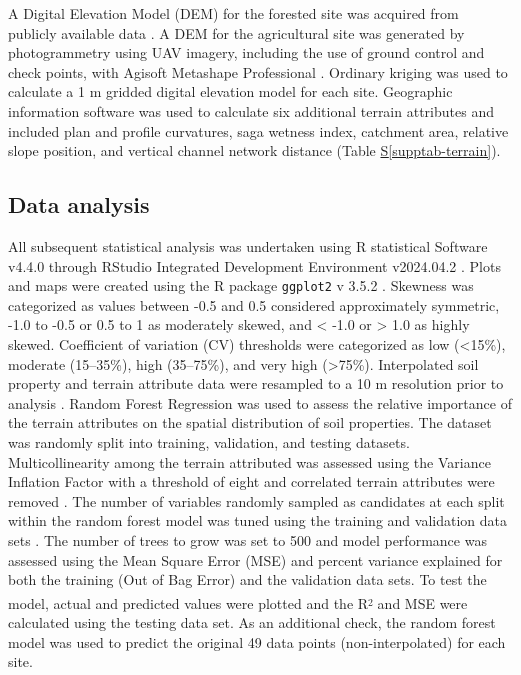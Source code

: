 \documentclass[
  number]{elsarticle}
\newcommand*\quartosupptabref[1]{Table \hyperref[#1]{S\ref{#1}}}
\begin{document}
A Digital Elevation Model (DEM) for the forested site was acquired from
publicly available data \citep{naturalresourcescanada2024}. A DEM for
the agricultural site was generated by photogrammetry using UAV imagery,
including the use of ground control and check points, with Agisoft
Metashape Professional \citep[v1.8.2][]{agisoft2021}. Ordinary kriging
was used to calculate a 1 m gridded digital elevation model for each
site. Geographic information software \citep[SAGA v2.1.4][]{conrad2015}
was used to calculate six additional terrain attributes and included
plan and profile curvatures, saga wetness index, catchment area,
relative slope position, and vertical channel network distance
(\quartosupptabref{supptab-terrain}).

\subsection{Data analysis}\label{data-analysis}

All subsequent statistical analysis was undertaken using R statistical
Software v4.4.0 \citep{rcoreteam2024} through RStudio Integrated
Development Environment v2024.04.2 \citep{rstudio2024}. Plots and maps
were created using the R package \texttt{ggplot2} v 3.5.2
\citep{wickham2016}. Skewness was categorized as values between -0.5 and
0.5 considered approximately symmetric, -1.0 to -0.5 or 0.5 to 1 as
moderately skewed, and \textless{} -1.0 or \textgreater{} 1.0 as highly
skewed. Coefficient of variation (CV) thresholds were categorized as low
(\textless15\%), moderate (15--35\%), high (35--75\%), and very high
(\textgreater75\%). Interpolated soil property and terrain attribute
data were resampled to a 10 m resolution prior to analysis
\citep[\texttt{terra} v1.8.42][]{hijmans2024}. Random Forest Regression
\citep[\texttt{randomForest} v4.7.1.2][]{liaw2002} was used to assess
the relative importance of the terrain attributes on the spatial
distribution of soil properties. The dataset was randomly split into
training, validation, and testing datasets. Multicollinearity among the
terrain attributed was assessed using the Variance Inflation Factor with
a threshold of eight and correlated terrain attributes were removed
\citep[\texttt{usdm} v2.1.7][]{Naimi2014}. The number of variables
randomly sampled as candidates at each split within the random forest
model was tuned using the training and validation data sets
\citep[\texttt{caret} v7.0.1][]{kuhn2008}. The number of trees to grow
was set to 500 and model performance was assessed using the Mean Square
Error (MSE) and percent variance explained for both the training (Out of
Bag Error) and the validation data sets. To test the model, actual and
predicted values were plotted and the
R\textsuperscript{\textsubscript{2}} and MSE were calculated using the
testing data set. As an additional check, the random forest model was
used to predict the original 49 data points (non-interpolated) for each
site.
\end{document}
